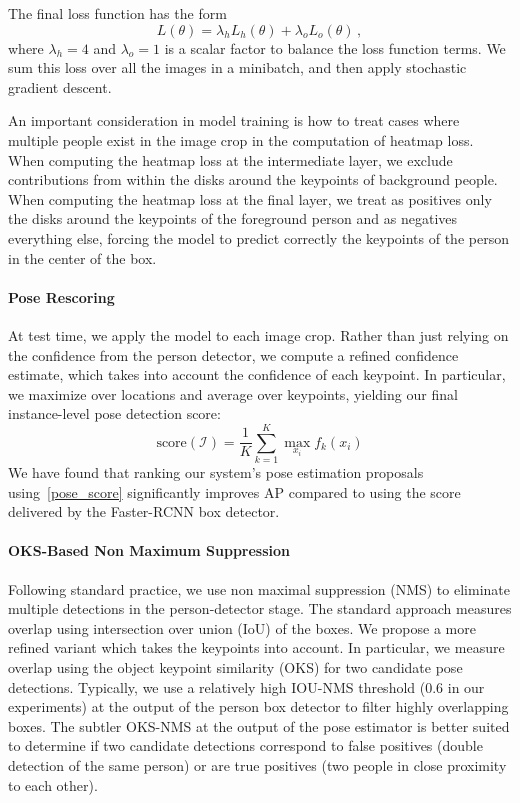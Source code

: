 \documentclass[10pt,twocolumn,letterpaper]{article}
\newcommand{\calI}{\mathcal{I}}
\begin{document}
The final loss function has the form
\begin{equation}
\label{pose_loss}
L(\theta) = \lambda_h L_h(\theta) + \lambda_o L_o(\theta) \,,
\end{equation}
where $\lambda_h=4$ and $\lambda_o=1$ is a scalar factor to balance the loss function terms. We sum this loss over all the images in a minibatch, and then apply stochastic gradient descent.

An important consideration in model training is how to treat cases where multiple people exist in the image crop in the computation of heatmap loss. When computing the heatmap loss at the intermediate layer, we exclude contributions from within the disks around the keypoints of background people. When computing the heatmap loss at the final layer, we treat as positives only the disks around the keypoints of the foreground person and as negatives everything else, forcing the model to predict correctly the keypoints of the person in the center of the box.

\paragraph{Pose Rescoring}
At test time,  we apply the model to each image crop. Rather than just relying on the confidence from the person detector, we compute a refined confidence estimate, which takes into account the confidence of each keypoint. In particular, we maximize over locations and average over keypoints, yielding our final instance-level pose detection score:
\begin{equation}
\label{pose_score}
\mbox{score}(\calI) = \frac{1}{K} \sum_{k=1}^K \max_{x_i} f_k(x_i)
\end{equation}
We have found that ranking our system's pose estimation proposals using~\ref{pose_score} significantly improves AP compared to using the score delivered by the Faster-RCNN box detector.

\paragraph{OKS-Based Non Maximum Suppression}
Following standard practice, we use non maximal suppression (NMS) to eliminate multiple detections in the person-detector stage. The standard approach measures overlap using intersection over union (IoU) of the boxes. We propose a more refined variant which takes the keypoints into account. In particular, we measure overlap using the object keypoint similarity (OKS) for two candidate pose detections. Typically, we use a relatively high IOU-NMS threshold (0.6 in our experiments) at the output of the person box detector to filter highly overlapping boxes. The subtler OKS-NMS at the output of the pose estimator is better suited to determine if two candidate detections correspond to false positives (double detection of the same person) or are true positives (two people in close proximity to each other).
\end{document}
